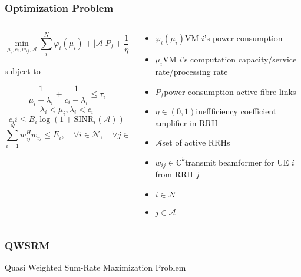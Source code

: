 \documentclass[usenames,dvipsnames]{beamer}
\begin{document}
\begin{frame}
  \frametitle{Optimization Problem}
  \vspace*{-2.5\baselineskip}
  \begin{columns}[t]
    \begin{column}{0.62\linewidth}
  \begin{exampleblock}{}
   \[
     \min_{\mu_{i},c_{i},w_{ij},\mathcal{A}}\sum_{i}^{N}\varphi_{i}(\mu_{i}) + \lvert\mathcal{A}\rvert P_{f} + \frac{1}{\eta}\sum_{i = 1}^{N}\sum_{j\in{A}}w_{ij}^{H}w_{ij}
   \]
  \end{exampleblock}
  subject to
  \begin{exampleblock}{}
    \[
      \frac{1}{\mu_{i}- \lambda_{i}} + \frac{1}{c_{i} - \lambda_{i}}\leq\tau_{i}
    \]
    \[
      \lambda_{i} < \mu_{i},\lambda_{i}<c_{i}
  \]
  \[
    c_i{i} \leq B_{i}\log(1+\text{SINR}_{i}(\mathcal{A}))
  \]
  \[
    \sum_{i=1}^{N}w_{ij}^{H}w_{ij}\leq E_{i},\quad \forall i\in \mathcal{N}, \quad \forall j\in \mathcal{L}
  \]
  \end{exampleblock}
\end{column}
\begin{column}{0.38\linewidth}
  \footnotesize\raggedright
  \begin{itemize}
    \item $\varphi_{i}(\mu_{i})$\quad VM $i$'s power consumption
    \item $\mu_{i}$\qquad VM $i$'s computation capacity/service rate/processing rate
    \item $P_{f}$\qquad power consumption active fibre links
    \item $\eta\in(0,1)$\quad ineffficiency coefficient amplifier in RRH
    \item $\mathcal{A}$\qquad set of active RRHs
    \item $w_{ij}\in\mathbb{C}^{k}$\quad transmit beamformer for UE $i$ from RRH $j$
    \item $i\in\mathcal{N}$
    \item $j\in\mathcal{A}$
  \end{itemize}
\end{column}
\end{columns}
\end{frame}
\begin{frame}
  \frametitle{QWSRM}
  \begin{exampleblock}{}
    \centering Quasi Weighted Sum-Rate Maximization Problem
  \end{exampleblock}
\end{frame}
\end{document}
